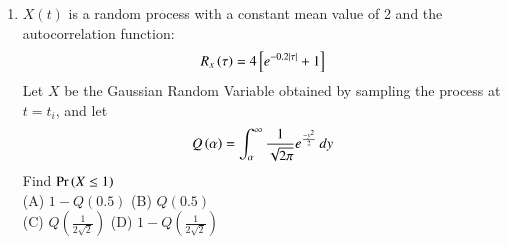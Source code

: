 \begin{enumerate}[label=\thesection.\arabic*.,ref=\thesection.\theenumi]
%
\item $X(t)$ is a random process with a constant mean value of 2 and the autocorrelation function:
\begin{align}
    R_x\brak{\tau} = 4\sbrak{e^{-0.2|\tau|} + 1}
    \label{autocorrelation}
\end{align}
Let $X$ be the Gaussian Random Variable obtained by sampling the process at $t = t_i$, and let 
\begin{align}
    Q\brak{\alpha} = \int_{\alpha}^{\infty} \frac{1}{\sqrt{2\pi}} e^{\frac{-y^2}{2}}\,dy
    \label{Q}
\end{align}
Find $\Pr\left(X \leq 1\right)$\\
(A) \(1 - Q(0.5)\) \hspace{1cm}
(B) \(Q(0.5)\) \\
(C) \(Q(\frac{1}{2\sqrt{2}})\) \hspace{1.6cm}
(D) \(1 - Q(\frac{1}{2\sqrt{2}})\)\\
\solution


\end{enumerate}